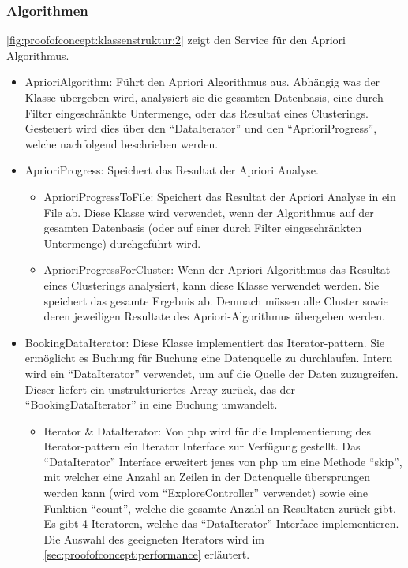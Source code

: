 \subsubsection{Algorithmen}
\label{sec:proofofconcept:klassenstruktur:algorithmen}
\cref{fig:proofofconcept:klassenstruktur:2} zeigt den Service für den Apriori Algorithmus.
\begin{itemize}
	\item AprioriAlgorithm: Führt den Apriori Algorithmus aus. Abhängig was der Klasse übergeben wird, analysiert sie die gesamten Datenbasis, eine durch Filter eingeschränkte Untermenge, oder das Resultat eines Clusterings. Gesteuert wird dies über den "`DataIterator"' und den "`AprioriProgress"', welche nachfolgend beschrieben werden.
	\item AprioriProgress: Speichert das Resultat der Apriori Analyse. 
	\begin{itemize}
		\item AprioriProgressToFile: Speichert das Resultat der Apriori Analyse in ein File ab. Diese Klasse wird verwendet, wenn der Algorithmus auf der gesamten Datenbasis (oder auf einer durch Filter eingeschränkten Untermenge) durchgeführt wird. 
		\item AprioriProgressForCluster: Wenn der Apriori Algorithmus das Resultat eines Clusterings analysiert, kann diese Klasse verwendet werden. Sie speichert das gesamte Ergebnis ab. Demnach müssen alle Cluster sowie deren jeweiligen Resultate des Apriori-Algorithmus übergeben werden.
	\end{itemize}
	\item BookingDataIterator: Diese Klasse implementiert das Iterator-\gls{pattern}. Sie ermöglicht es Buchung für Buchung eine Datenquelle zu durchlaufen. Intern wird ein "`DataIterator"' verwendet, um auf die Quelle der Daten zuzugreifen. Dieser liefert ein unstrukturiertes Array zurück, das der "`BookingDataIterator"' in eine Buchung umwandelt.
		\begin{itemize}
			\item Iterator \& DataIterator: Von \gls{php} wird für die Implementierung des Iterator-\gls{pattern} ein Iterator Interface zur Verfügung gestellt. Das "`DataIterator"' Interface erweitert jenes von \gls{php} um eine Methode "`skip"', mit welcher eine Anzahl an Zeilen in der Datenquelle übersprungen werden kann (wird vom "`ExploreController"' verwendet) sowie eine Funktion "`count"', welche die gesamte Anzahl an Resultaten zurück gibt. Es gibt 4 Iteratoren, welche das "`DataIterator"' Interface implementieren. Die Auswahl des geeigneten Iterators wird im \cref{sec:proofofconcept:performance}  erläutert.

\end{itemize}
\end{itemize}
